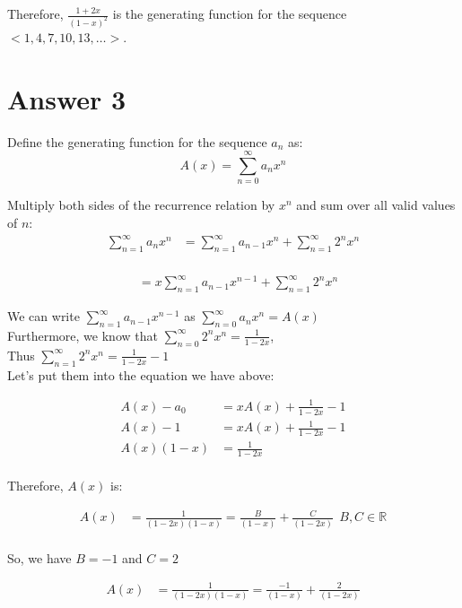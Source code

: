\documentclass[12pt]{article}
\begin{document}
Therefore, \( \frac{1+2x}{(1-x)^2} \)  is the generating function for the sequence \( <1, 4, 7, 10, 13, \dots> \).



\section*{Answer 3}

Define the generating function for the sequence \( a_n \) as:
\[ A(x) = \sum_{n=0}^{\infty} a_n x^n \]

Multiply both sides of the recurrence relation by \( x^n \) and sum over all valid values of \( n \):
\begin{align*}
\sum_{n=1}^{\infty} a_n x^n &= \sum_{n=1}^{\infty} a_{n-1} x^n + \sum_{n=1}^{\infty} 2^n x^n \\
\end{align*}

\begin{align*}
&= x\sum_{n=1}^{\infty} a_{n-1} x^{n-1} + \sum_{n=1}^{\infty} 2^n x^n
\end{align*}

We can write \( \sum_{n=1}^{\infty} a_{n-1} x^{n-1}\) as \( \sum_{n=0}^{\infty} a_{n} x^{n} = A(x) \) \\

Furthermore, we know that  \( \sum_{n=0}^{\infty} 2^n x^n = \frac{1}{1-2x} \),\\

Thus \( \sum_{n=1}^{\infty} 2^n x^n = \frac{1}{1-2x} - 1\)\\

Let's put them into the equation we have above:

\begin{align*}
A(x)-a_{0} &= xA(x) + \frac{1}{1-2x} - 1\\
A(x)-1 &= xA(x) + \frac{1}{1-2x} - 1\\
A(x)(1-x) &= \frac{1}{1-2x}\\
\end{align*}

Therefore, \( A(x) \) is:

\begin{align*}
A(x)&= \frac{1}{(1-2x)(1-x)} = \frac{B}{(1-x)} + \frac{C}{(1-2x)}  \ \ B,C \in \mathbb{R}\\
\end{align*}

So, we have \( B=-1\) and \(C=2\)

\begin{align*}
A(x)&= \frac{1}{(1-2x)(1-x)} = \frac{-1}{(1-x)} + \frac{2}{(1-2x)}  \\
\end{align*}
\end{document}
